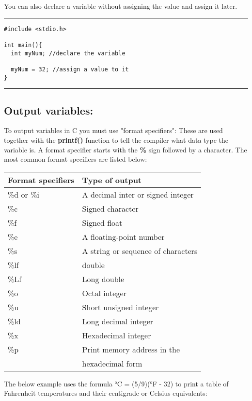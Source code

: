 \documentclass[a4paper]{article}
\begin{document}
You can also declare a variable without assigning the value and assign it
later.

\noindent\rule{\textwidth}{0.5pt}
\begin{verbatim}
#include <stdio.h>

int main(){
  int myNum; //declare the variable

  myNum = 32; //assign a value to it
}
\end{verbatim}

\noindent\rule{\textwidth}{0.5pt}

\subsection{Output variables:}
\label{sec:org6a5b202}
To output variables in C you must use "format specifiers":
These are used together with the \textbf{printf()} function to tell the compiler what
data type the variable is.
A format specifier starts with the \textbf{\%} sign followed by a character.
The most common format specifiers are listed below:
\begin{center}
\begin{tabular}{l|l}
\hline
Format specifiers & Type of output\\
\hline
\%d or \%i & A decimal inter or signed integer\\
\hline
\%c & Signed character\\
\hline
\%f & Signed float\\
\hline
\%e & A floating-point number\\
\hline
\%s & A string or sequence of characters\\
\hline
\%lf & double\\
\hline
\%Lf & Long double\\
\hline
\%o & Octal integer\\
\hline
\%u & Short unsigned integer\\
\hline
\%ld & Long decimal integer\\
\hline
\%x & Hexadecimal integer\\
\hline
\%p & Print memory address in the\\
 & hexadecimal form\\
\hline
\end{tabular}
\end{center}

The below example uses the formula °C = (5/9)(°F - 32) to print a table of
Fahrenheit temperatures and their centigrade or Celsius equivalents:
\end{document}
